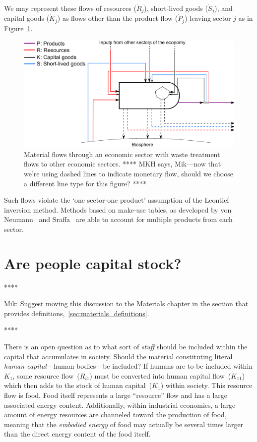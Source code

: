 We may represent these flows of resources ($\dot{R}_{j}$), 
short-lived goods ($\dot{S}_{j}$), and capital goods ($\dot{K}_{j}$)
as flows other than the product flow ($\dot{P}_{j}$)
leaving sector $j$
as in Figure~\ref{fig:PERKS_waste}.

\begin{figure}
	\includegraphics[width=\linewidth]{Part_3/Chapter_Unfinished/images/PERKS_basic_unit_materials_recycle.pdf}
	\caption[Material flows through an economic sector with waste treatment]{Material flows 
					through an economic sector with waste treatment flows to other economic sectors.
					**** MKH says, Mik---now that we're using dashed lines to
					indicate monetary flow, should we choose a different line type for this figure?
					****}
\label{fig:PERKS_waste}
\end{figure}

Such flows violate the `one sector-one product' assumption of the Leontief inversion method.
Methods based on make-use tables,
as developed by von Neumann~\cite{vonNeumann1945} and Sraffa~\cite{Sraffa1960}
are able to account for multiple products from each sector.


\section{Are people capital stock?}
\label{sec:people_as_stock}

****

Mik: Suggest moving this discussion to the Materials chapter in the 
section that provides definitions,~\ref{sec:materials_definitions}.

****

There is an open
question as to what sort of \emph{stuff} 
should be included within the capital
that accumulates in society. 
Should the material constituting literal
\emph{human capital}---human bodies---be included? 
If humans are to be included within $K_{1}$, 
some resource flow~($\dot{R}_{i1}$)
must be converted into 
human capital flow~($\dot{K}_{11}$)
which then adds to the stock of human capital~($K_{1}$)
within society.
This resource flow is food.
Food itself represents a large ``resource''
flow and has a large associated energy content. 
Additionally, 
within industrial economies, 
a large amount of energy resources 
are channeled toward the production of food, 
meaning that the \emph{embodied energy}
of food may actually be several times larger than
the direct energy content of the food itself. 

